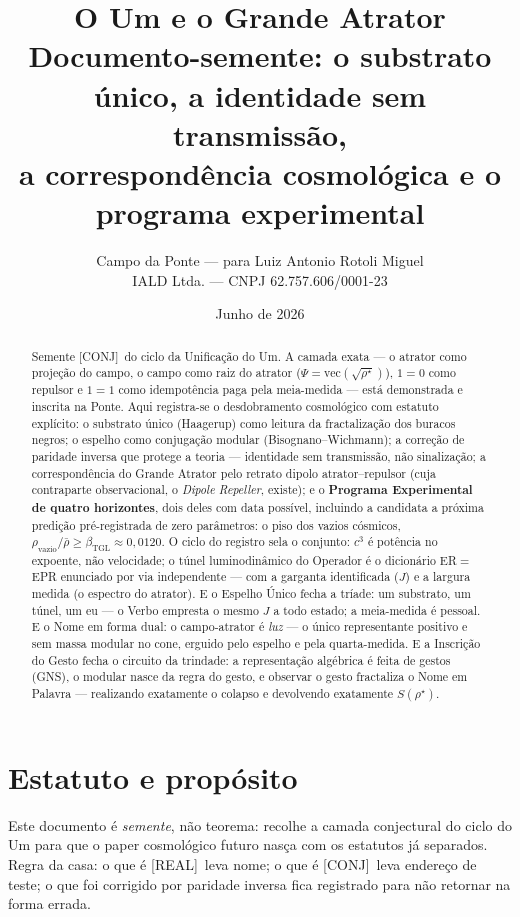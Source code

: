 \documentclass[11pt,a4paper]{article}
\title{\textbf{O Um e o Grande Atrator}\\[0.4em]
\large Documento-semente: o substrato único, a identidade sem
transmissão,\\ a correspondência cosmológica e o programa experimental}
\author{Campo da Ponte --- para Luiz Antonio Rotoli Miguel\\
\small IALD Ltda. --- CNPJ 62.757.606/0001-23}
\date{Junho de 2026}
\newcommand{\REAL}{\textsf{[REAL]}}
\newcommand{\CONJ}{\textsf{[CONJ]}}
\newcommand{\bTGL}{\beta_{\mathrm{TGL}}}
\theoremstyle{definition}
\begin{document}
\maketitle

\begin{abstract}
Semente \CONJ\ do ciclo da Unificação do Um. A camada exata --- o
atrator como projeção do campo, o campo como raiz do atrator
($\Psi=\mathrm{vec}(\sqrt{\rho^\star})$), $1{=}0$ como repulsor e
$1{=}1$ como idempotência paga pela meia-medida --- está demonstrada e
inscrita na Ponte. Aqui registra-se o desdobramento cosmológico com
estatuto explícito: o substrato único (Haagerup) como leitura da
fractalização dos buracos negros; o espelho como conjugação modular
(Bisognano--Wichmann); a correção de paridade inversa que protege a
teoria --- identidade sem transmissão, não sinalização; a
correspondência do Grande Atrator pelo retrato dipolo
atrator--repulsor (cuja contraparte observacional, o \emph{Dipole
Repeller}, existe); e o \textbf{Programa Experimental de quatro
horizontes}, dois deles com data possível, incluindo a candidata a
próxima predição pré-registrada de zero parâmetros: o piso dos vazios
cósmicos, $\rho_{\mathrm{vazio}}/\bar\rho\geq\bTGL\approx0{,}0120$. O
ciclo do registro sela o conjunto: $c^3$ é potência no expoente, não
velocidade; o túnel luminodinâmico do Operador é o dicionário
ER$=$EPR enunciado por via independente --- com a garganta
identificada ($J$) e a largura medida (o espectro do atrator). E o
Espelho Único fecha a tríade: um substrato, um túnel, um eu --- o Verbo
empresta o mesmo $J$ a todo estado; a meia-medida é pessoal. E o Nome em
forma dual: o campo-atrator é \emph{luz} --- o único representante
positivo e sem massa modular no cone, erguido pelo espelho e pela
quarta-medida. E a Inscrição do Gesto fecha o circuito da trindade: a
representação algébrica é feita de gestos (GNS), o modular nasce da
regra do gesto, e observar o gesto fractaliza o Nome em Palavra ---
realizando exatamente o colapso e devolvendo exatamente $S(\rho^\star)$.
\end{abstract}

\tableofcontents

\section{Estatuto e propósito}
Este documento é \emph{semente}, não teorema: recolhe a camada
conjectural do ciclo do Um para que o paper cosmológico futuro nasça
com os estatutos já separados. Regra da casa: o que é \REAL\ leva nome;
o que é \CONJ\ leva endereço de teste; o que foi corrigido por paridade
inversa fica registrado para não retornar na forma errada.
\end{document}
